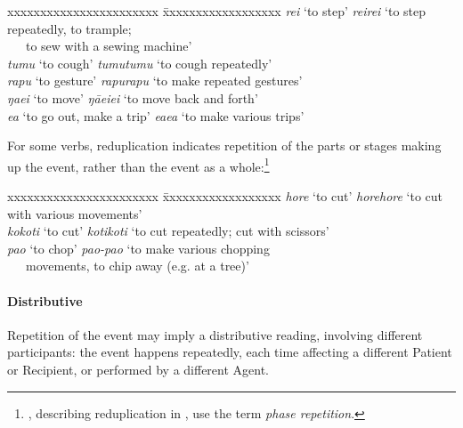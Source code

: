 \ea
\begin{tabbing}
 xxxxxxxxxxxxxxxxxxxxxxx \= xxxxxxxxxxxxxxxxxx\kill
\textit{rei} ‘to step’ \> \textit{reirei} ‘to step repeatedly, to trample; \\
\> ~~~to sew with a sewing machine’\\
  \textit{tumu} ‘to cough’ \>   \textit{tumutumu} ‘to cough repeatedly’\\
  \textit{rapu} ‘to gesture’  \>  \textit{rapurapu} ‘to make repeated gestures’\\
  \textit{ŋae{\ꞌ}i} ‘to move’  \>  \textit{ŋāe{\ꞌ}ie{\ꞌ}i} ‘to move back and forth’\\
  \textit{e{\ꞌ}a} ‘to go out, make a trip’  \>  \textit{e{\ꞌ}ae{\ꞌ}a} ‘to make various trips’  
\end{tabbing}
\z 
For some verbs, reduplication indicates repetition of the parts or stages making up the event, rather than the event as a whole:\footnote{\label{fn:84}\citet{Haji-AbdolhosseiniMassam2002}, describing reduplication in , use the term \textit{phase repetition}.}

\ea
\begin{tabbing}
 xxxxxxxxxxxxxxxxxxxxxxx \= xxxxxxxxxxxxxxxxxx\kill
  \textit{hore} ‘to cut’  \>  \textit{horehore} ‘to cut with various movements’\\
  \textit{kokoti} ‘to cut’   \> \textit{kotikoti} ‘to cut repeatedly; cut with scissors’\\
  \textit{pa{\ꞌ}o} ‘to chop’  \>  \textit{pa{\ꞌ}o\nobreakdash-pa{\ꞌ}o} ‘to make various chopping \\
 \> ~~~movements, to chip away (e.g. at a tree)’
\end{tabbing}
\z 
\paragraph{Distributive}\label{sec:2.6.2.2.2} Repetition of the event may imply a distributive reading, involving different participants: the event happens repeatedly, each time affecting a different Patient or Recipient, or performed by a different Agent.

